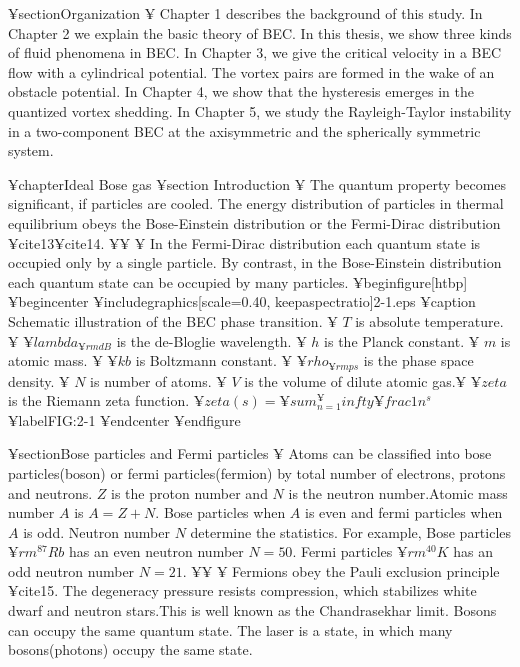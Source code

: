 ¥section{Organization}
¥ Chapter 1 describes the background of this study.
In Chapter 2 we explain the basic theory of BEC.
In this thesis, we show three kinds of fluid phenomena in BEC.
In Chapter 3, we give the critical velocity in a BEC flow with 
 a cylindrical potential. The vortex pairs are formed in the wake of an obstacle potential.
In Chapter 4, we show that the hysteresis emerges in the quantized vortex shedding.
In Chapter 5, we study the Rayleigh-Taylor instability in a two-component BEC at 
the axisymmetric and the spherically symmetric system.

¥chapter{Ideal Bose gas}
¥section {Introduction }
¥ The quantum property becomes significant, if particles are cooled.
The energy distribution of particles in thermal equilibrium obeys
the Bose-Einstein distribution or the Fermi-Dirac distribution ¥cite{13}¥cite{14}.
¥¥
¥ In the Fermi-Dirac distribution each quantum state is occupied only by a single particle.
By contrast, in the Bose-Einstein distribution each quantum state can be occupied by many particles.
¥begin{figure}[htbp]
¥begin{center}
¥includegraphics[scale=0.40, keepaspectratio]{2-1.eps}
¥caption{
Schematic illustration of the BEC phase transition. ¥ $T$ is absolute temperature.
¥ ${¥lambda_{¥rm dB}}$ is the de-Bloglie wavelength. ¥ $h$ is the Planck constant.
¥ $m$ is atomic mass.
¥ $¥kb$ is Boltzmann constant. ¥ $¥rho_{{¥rm ps}}$ is the phase space density.
¥ $N$ is number of atoms. ¥ $V$ is the volume of dilute atomic gas.¥ $¥zeta$ is the Riemann zeta function.
$¥zeta(s)=¥sum_{n=1}^¥infty ¥frac{1}{n^s}$
}
¥label{FIG:2-1}
¥end{center}
¥end{figure}

¥section{Bose particles and Fermi particles}
¥ Atoms can be classified into bose particles(boson) or fermi particles(fermion)
by total number of electrons, protons and neutrons.
$Z$ is the proton number and $N$ is the neutron number.Atomic mass number $A$ is
$A = Z + N$. Bose particles when $A$ is even and fermi particles when $A$ is odd.
Neutron number $N$ determine the statistics.
For example, Bose particles ${¥rm ^{87}Rb}$ has an even neutron number $N = 50$.
Fermi particles ${¥rm ^{40}K}$ has an odd neutron number $N = 21$.
¥¥
¥ Fermions obey the Pauli exclusion principle ¥cite{15}.
The degeneracy pressure resists compression, which stabilizes white dwarf
and neutron stars.This is well known as the Chandrasekhar limit.
Bosons can occupy the same quantum state. The laser is a state, in which many bosons(photons)
occupy the same state.

